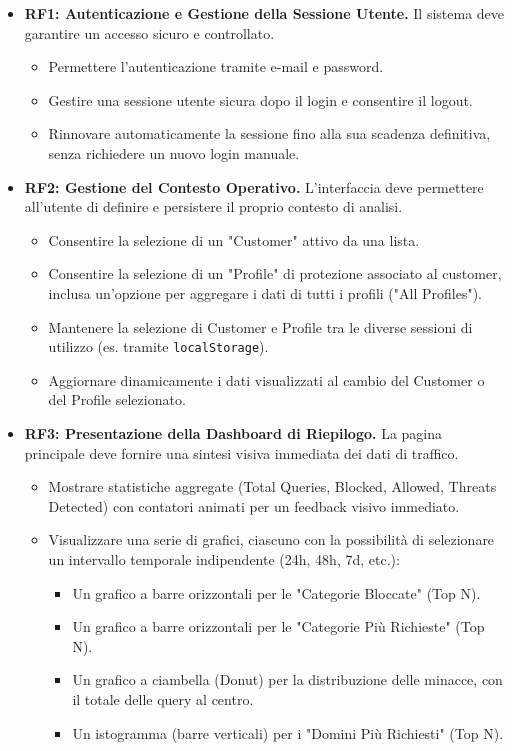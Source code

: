 \documentclass[12pt,a4paper,openright,twoside]{book}
\begin{document}
\begin{itemize}
    \item \textbf{RF1: Autenticazione e Gestione della Sessione Utente.} Il sistema deve garantire un accesso sicuro e controllato.
    \begin{itemize}
        \item Permettere l'autenticazione tramite e-mail e password.
        \item Gestire una sessione utente sicura dopo il login e consentire il logout.
        \item Rinnovare automaticamente la sessione fino alla sua scadenza definitiva, senza richiedere un nuovo login manuale.
    \end{itemize}

    \item \textbf{RF2: Gestione del Contesto Operativo.} L'interfaccia deve permettere all'utente di definire e persistere il proprio contesto di analisi.
    \begin{itemize}
        \item Consentire la selezione di un "Customer" attivo da una lista.
        \item Consentire la selezione di un "Profile" di protezione associato al customer, inclusa un'opzione per aggregare i dati di tutti i profili ("All Profiles").
        \item Mantenere la selezione di Customer e Profile tra le diverse sessioni di utilizzo (es. tramite \texttt{localStorage}).
        \item Aggiornare dinamicamente i dati visualizzati al cambio del Customer o del Profile selezionato.
    \end{itemize}

    \item \textbf{RF3: Presentazione della Dashboard di Riepilogo.} La pagina principale deve fornire una sintesi visiva immediata dei dati di traffico.
    \begin{itemize}
        \item Mostrare statistiche aggregate (Total Queries, Blocked, Allowed, Threats Detected) con contatori animati per un feedback visivo immediato.
        \item Visualizzare una serie di grafici, ciascuno con la possibilità di selezionare un intervallo temporale indipendente (24h, 48h, 7d, etc.):
        \begin{itemize}
            \item Un grafico a barre orizzontali per le "Categorie Bloccate" (Top N).
            \item Un grafico a barre orizzontali per le "Categorie Più Richieste" (Top N).
            \item Un grafico a ciambella (Donut) per la distribuzione delle minacce, con il totale delle query al centro.
            \item Un istogramma (barre verticali) per i "Domini Più Richiesti" (Top N).
        \end{itemize}
    \end{itemize}
    

\end{itemize}
\end{document}
